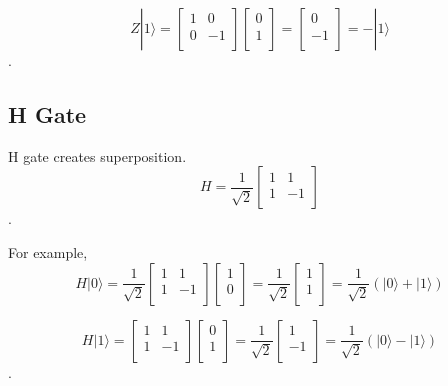 \begin{equation}
Z|1\rangle = \begin{bmatrix}
1 & 0 \\
0 & -1 \\
\end{bmatrix} 
\left[
\begin{array}{c}
0 \\
1  \\
\end{array}
\right]
= \left[
\begin{array}{c}
0 \\
-1 \\
\end{array}
\right]
= -|1\rangle
\end{equation}.

\subsection{H Gate}
H gate creates superposition.
\begin{equation}
 H = \frac{1}{\sqrt{2}}\begin{bmatrix}
1 & 1\\
1 & -1 \\
\end{bmatrix}
\end{equation}.

For example,
\begin{equation}
H|0\rangle = \frac{1}{\sqrt{2}}\begin{bmatrix}
1 & 1\\
1 & -1 \\
\end{bmatrix}\left[
\begin{array}{c}
1 \\
0 \\
\end{array}
\right]
= \frac{1}{\sqrt{2}} \left[
\begin{array}{c}
1 \\
1 \\
\end{array}
\right]
= \frac{1}{\sqrt{2}} (|0\rangle + |1\rangle)
\end{equation}

\begin{equation}
H|1\rangle = \begin{bmatrix}
1 & 1\\
1 & -1 \\
\end{bmatrix} 
\left[
\begin{array}{c}
0 \\
1  \\
\end{array}
\right]
= \frac{1}{\sqrt{2}} \left[
\begin{array}{c}
1 \\
-1 \\
\end{array}
\right]
=\frac{1}{\sqrt{2}} (|0\rangle - |1\rangle)
\end{equation}.

